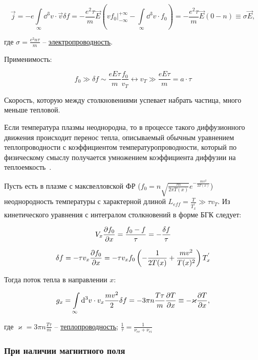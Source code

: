 \documentclass[10pt, a4paper]{article}
\begin{document}
\begin{equation*}
	\vec{j} = -e\int\limits_{\infty}\dd^3v\cdot \vec{v} \delta f = -\frac{e^2\tau}{m} \vec{E} \left(vf_0\bigg|_{-\infty}^{+\infty}-\int\limits_{\infty}\dd^3v\cdot f_0\right) = -\frac{e^2\tau}{m} \vec{E} (0-n) \equiv \sigma \vec{E},
\end{equation*}

где $\sigma = \frac{e^2n\tau}{m}$ -- \uline{электропроводность}.

Применимость:

\begin{equation*}
	f_0 \gg \delta f \sim \frac{eE\tau}{m}\frac{f_0}{v_T} \leftrightarrow v_T \gg \frac{eE\tau}{m} = a\cdot \tau
\end{equation*}

Скорость, которую между столкновениями успевает набрать частица, много меньше тепловой.

Если температура плазмы неоднородна, то в процессе такого
диффузионного движения происходит перенос тепла, описываемый
обычным уравнением теплопроводности с коэффициентом температуропроводности, который по физическому смыслу получается
умножением коэффициента диффузии на теплоемкость~\cite{arzimovich}.

Пусть есть в плазме с максвелловской ФР ($f_0 = n\sqrt{\frac{m}{2\pi T(x)}}e^{-\frac{mv^2}{2T(x)}}$) неоднородность температуры с характерной длиной $L_{eff} = \frac{T}{T_x^{'}} \gg \tau v_T$. Из кинетического уравнения с интегралом столкновений в форме БГК следует:

\begin{equation*}
	V_x\pdv{f_0}{x} = \frac{f_0-f}{\tau} = -\frac{\delta f}{\tau}
\end{equation*}

\begin{equation*}
	\delta f = -\tau v_x \pdv{f_0}{x} = -\tau v_x f_0 \left(-\frac{1}{2T(x)}+\frac{mv^2}{T(x)^2}\right)T_x^{'}
\end{equation*}

Тогда поток тепла в направлении $x$:

\begin{equation*}
	g_x = \int\limits_{\infty}\dd^3v\cdot v_x\frac{mv^2}{2}\delta f = -3\pi n \frac{T\tau}{m} \pdv{T}{x} \equiv -\varkappa \pdv{T}{x},
\end{equation*}

где $\varkappa = 3\pi n \frac{T\tau}{m}$ -- \uline{теплопроводность}; $\frac{1}{\tau} = \frac{1}{\nu_{ee}+\nu_{ei}}$

\subsubsection{При наличии магнитного поля}
\end{document}
